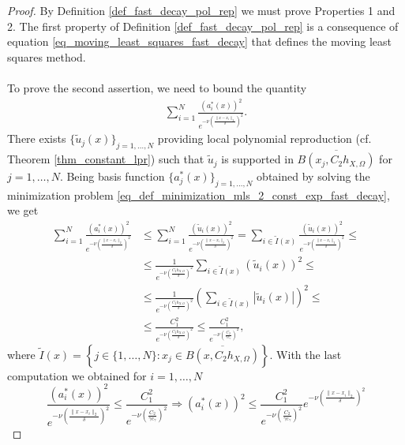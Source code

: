 \documentclass{drna}
\begin{document}
\begin{proof}
By Definition \ref{def_fast_decay_pol_rep} we must prove Properties 1 and 2.
The first property of Definition \ref{def_fast_decay_pol_rep} is a consequence of equation \eqref{eq_moving_least_squares_fast_decay} that defines the moving least squares method.
\\
\\
To prove the second assertion, we need to bound the quantity
\begin{equation*}
\begin{split}
     \sum_{i=1}^{N} \frac{(a_{i}^{*}(x))^2}{e^{-\nu \left(\frac{\|x-x_i\|_2}{\delta}\right)^2}}.
\end{split}
\end{equation*}
There exists $\{\widetilde{u}_j(x)\}_{j=1,\dots,N}$ providing local polynomial reproduction (cf. Theorem \ref{thm_constant_lpr}) such that $\widetilde{u}_j$ is supported in $\overline{B(x_j, C_2 h_{X,\Omega})}$ for $j=1,\dots,N$.
Being basis function $\{a_{j}^{*}(x)\}_{j=1,\dots,N}$ obtained by solving the minimization problem \eqref{eq_def_minimization_mls_2_const_exp_fast_decay}, we get
\begin{equation}
    \begin{split}
        \sum_{i=1}^N \frac{(a_{i}^{*}(x))^2}{e^{-\nu \left(\frac{\|x-x_i\|_2}{\delta}\right)^2}} & \leq \sum_{i=1}^{N} \frac{(\widetilde{u}_i(x))^2}{e^{-\nu \left(\frac{\|x-x_i\|_2}{\delta}\right)^2}} = \sum_{i \in \widetilde{I}(x)} \frac{(\widetilde{u}_i(x))^2}{e^{-\nu \left(\frac{\|x-x_i\|_2}{\delta}\right)^2}} \leq \\
        & \leq \frac{1}{e^{-\nu \left(\frac{C_2 h_{X,\Omega}}{\delta}\right)^2}} \sum_{i \in \widetilde{I}(x)} (\widetilde{u}_i(x))^2 \leq \\
        & \leq \frac{1}{e^{-\nu \left(\frac{C_2 h_{X,\Omega}}{\delta}\right)^2}} \left( \sum_{i \in \widetilde{I}(x)} |\widetilde{u}_i(x)| \right)^2 \leq \\
        & \leq \frac{C_1^2}{e^{-\nu \left(\frac{C_2 h_{X,\Omega}}{\delta}\right)^2}} \leq \frac{C_1^2}{e^{-\nu \left(\frac{C_2}{\gamma c_\gamma}\right)^2}},
    \end{split}
    \label{eq_computation_proof_mls}
\end{equation}
where $\widetilde{I}(x)=\left\{j \in \{1,\dots,N\} : x_j \in \overline{B(x,C_2 h_{X,\Omega})}\right\}$. With the last computation we obtained for $i=1,\dots,N$
\begin{equation*}
    \frac{(a_{i}^{*}(x))^2}{e^{-\nu \left(\frac{\|x-x_i\|_2}{\delta}\right)^2}} \leq \frac{C_1^2}{e^{-\nu \left(\frac{C_2}{\gamma c_\gamma}\right)^2}} \Rightarrow (a_{i}^{*}(x))^2 \leq \frac{C_1^2}{e^{-\nu \left(\frac{C_2}{\gamma c_\gamma}\right)^2}} e^{-\nu \left(\frac{\|x-x_i\|_2}{\delta}\right)^2}

\end{equation*}
\end{proof}
\end{document}
